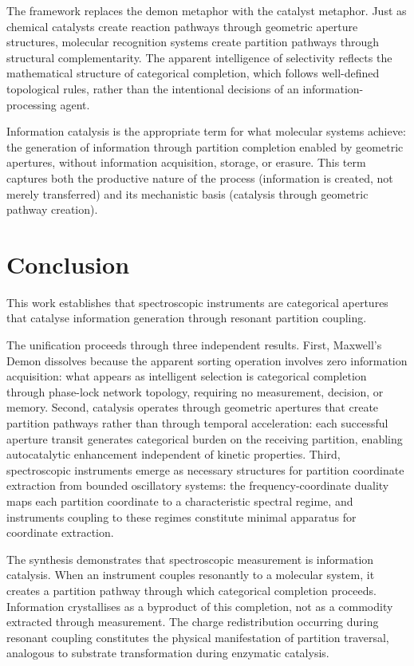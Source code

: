 \documentclass[twocolumn,10pt,a4paper]{article}
\theoremstyle{definition}
\theoremstyle{remark}
\begin{document}
The framework replaces the demon metaphor with the catalyst metaphor. Just as chemical catalysts create reaction pathways through geometric aperture structures, molecular recognition systems create partition pathways through structural complementarity. The apparent intelligence of selectivity reflects the mathematical structure of categorical completion, which follows well-defined topological rules, rather than the intentional decisions of an information-processing agent.

Information catalysis is the appropriate term for what molecular systems achieve: the generation of information through partition completion enabled by geometric apertures, without information acquisition, storage, or erasure. This term captures both the productive nature of the process (information is created, not merely transferred) and its mechanistic basis (catalysis through geometric pathway creation).

\section{Conclusion}
\label{sec:conclusion}

This work establishes that spectroscopic instruments are categorical apertures that catalyse information generation through resonant partition coupling.

The unification proceeds through three independent results. First, Maxwell's Demon dissolves because the apparent sorting operation involves zero information acquisition: what appears as intelligent selection is categorical completion through phase-lock network topology, requiring no measurement, decision, or memory. Second, catalysis operates through geometric apertures that create partition pathways rather than through temporal acceleration: each successful aperture transit generates categorical burden on the receiving partition, enabling autocatalytic enhancement independent of kinetic properties. Third, spectroscopic instruments emerge as necessary structures for partition coordinate extraction from bounded oscillatory systems: the frequency-coordinate duality maps each partition coordinate to a characteristic spectral regime, and instruments coupling to these regimes constitute minimal apparatus for coordinate extraction.

The synthesis demonstrates that spectroscopic measurement is information catalysis. When an instrument couples resonantly to a molecular system, it creates a partition pathway through which categorical completion proceeds. Information crystallises as a byproduct of this completion, not as a commodity extracted through measurement. The charge redistribution occurring during resonant coupling constitutes the physical manifestation of partition traversal, analogous to substrate transformation during enzymatic catalysis.
\end{document}
